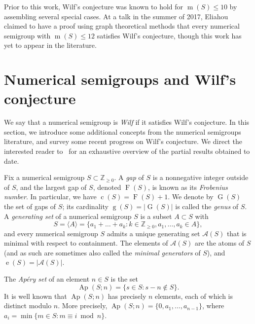 \documentclass[12pt]{amsart}
\theoremstyle{definition}
\numberwithin{equation}{section}
\newcommand{\ring}[1]{\ensuremath{\mathbb{#1}}}
\renewcommand\>{\rangle}
\newcommand\<{\langle}
\newcommand\0{\mathbf{0}}
\newcommand\ZZ{\ring{Z}}
\DeclareMathOperator\Ap{Ap} %
\begin{document}
Prior to this work, Wilf's conjecture was known to hold for $\operatorname m(S) \le 10$ by assembling several special cases.  At a talk in the summer of 2017, Eliahou~\cite{eliahou-imns} claimed to have a proof using graph theoretical methods that every numerical semigroup with $\operatorname m(S) \le 12$ satisfies Wilf's conjecture, though this work has yet to appear in the literature.  


\section{Numerical semigroups and Wilf's conjecture}%
\label{sec:wilf}%

We say that a numerical semigroup is \emph{Wilf} if it satisfies Wilf's conjecture.  In this section, we introduce some additional concepts from the numerical semigroups literature, and survey some recent progress on Wilf's conjecture.  We direct the interested reader to~\cite{wilf-survey} for an exhaustive overview of the partial results obtained to date.  

Fix a numerical semigroup $S \subset \ZZ_{\ge 0}$.  A \emph{gap} of $S$ is a nonnegative integer outside of $S$, and the largest gap of $S$, denoted $\operatorname F(S)$, is known as its \emph{Frobenius number}.  In particular, we have $\operatorname c(S) = \operatorname F(S) + 1$.  We denote by $\operatorname G(S)$ the set of gaps of $S$; its cardinality $\operatorname g(S) = |\operatorname G(S)|$ is called the \emph{genus} of $S$.  A \emph{generating set} of a numerical semigroup $S$ is a subset $A \subset S$ with 
\[
S = \<A\> = \{a_1 + \dots + a_k : k \in \ZZ_{\ge 0}, a_1, \ldots, a_k \in A\},
\]
and every numerical semigroup $S$ admits a unique generating set $\mathcal A(S)$ that is minimal with respect to containment.  The elements of $\mathcal A(S)$ are the atoms of $S$ (and as such are sometimes also called the \emph{minimal generators} of $S$), and $\operatorname e(S) = |\mathcal A(S)|$.  

The \emph{Ap\'ery set} of an element $n \in S$ is the set 
\[
\Ap(S;n) = \{s \in S : s - n \notin S\}.
\]
It is well known that $\Ap(S;n)$ has precisely $n$ elements, each of which is distinct modulo $n$.  More precisely, $\Ap(S;n) = \{0, a_1, \ldots, a_{n-1}\}$, where $a_i = \min\{m \in S: m \equiv i \bmod n\}$. 
\end{document}
